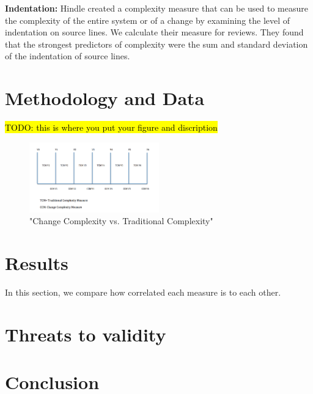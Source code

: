 \documentclass[11pt,twocolumn,a4paper]{article}
\begin{document}
{\bf Indentation:} Hindle \cite{Hindle2008ICPC} created a complexity
measure that can be used to measure the complexity of the entire system or of a
change by examining the level of indentation on source lines. We calculate
their measure for reviews. They found that the strongest predictors of
complexity were the sum and standard deviation of the indentation of source
lines. 


\section{Methodology and Data}

\hl{TODO: this is where you put your figure and discription}

\begin{figure}[h!]
  \centering
   \includegraphics[width=0.5\textwidth]{change_complexity_figure}
   \caption{"Change Complexity vs. Traditional Complexity"}
\end{figure}

\section{Results}

In this section, we compare how correlated each measure is to each other.

\section{Threats to validity}

\section{Conclusion}
\end{document}
